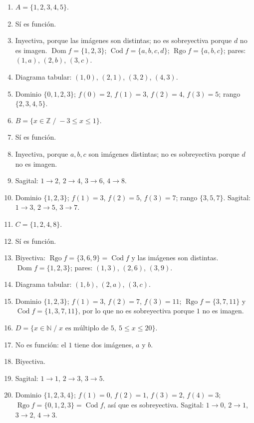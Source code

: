 \documentclass[12pt, letterpaper]{article}
\newcommand{\N}{\mathbb{N}}
\newcommand{\Z}{\mathbb{Z}}
\begin{document}
\begin{enumerate}[leftmargin=*, label=\textbf{\arabic*.}]
  \item $A=\{1,2,3,4,5\}$.
  \item Sí es función.
  \item Inyectiva, porque las imágenes son distintas; no es sobreyectiva porque $d$ no es imagen. $\operatorname{Dom} f=\{1,2,3\}$; $\operatorname{Cod} f=\{a,b,c,d\}$; $\operatorname{Rgo} f=\{a,b,c\}$; pares: $(1,a)$, $(2,b)$, $(3,c)$.
  \item Diagrama tabular: $(1,0)$, $(2,1)$, $(3,2)$, $(4,3)$.
  \item Dominio $\{0,1,2,3\}$; $f(0)=2$, $f(1)=3$, $f(2)=4$, $f(3)=5$; rango $\{2,3,4,5\}$.
  \item $B=\{x\in\Z \;/\; -3\le x\le 1\}$.
  \item Sí es función.
  \item Inyectiva, porque $a,b,c$ son imágenes distintas; no es sobreyectiva porque $d$ no es imagen.
  \item Sagital: $1\to2$, $2\to4$, $3\to6$, $4\to8$.
  \item Dominio $\{1,2,3\}$; $f(1)=3$, $f(2)=5$, $f(3)=7$; rango $\{3,5,7\}$. Sagital: $1\to3$, $2\to5$, $3\to7$.
  \item $C=\{1,2,4,8\}$.
  \item Sí es función.
  \item Biyectiva: $\operatorname{Rgo} f=\{3,6,9\}=\operatorname{Cod} f$ y las imágenes son distintas. $\operatorname{Dom} f=\{1,2,3\}$; pares: $(1,3)$, $(2,6)$, $(3,9)$.
  \item Diagrama tabular: $(1,b)$, $(2,a)$, $(3,c)$.
  \item Dominio $\{1,2,3\}$; $f(1)=3$, $f(2)=7$, $f(3)=11$; $\operatorname{Rgo} f=\{3,7,11\}$ y $\operatorname{Cod} f=\{1,3,7,11\}$, por lo que no es sobreyectiva porque $1$ no es imagen.
  \item $D=\{x\in\N \;/\; x \text{ es múltiplo de } 5,\ 5\le x\le 20\}$.
  \item No es función: el $1$ tiene dos imágenes, $a$ y $b$.
  \item Biyectiva.
  \item Sagital: $1\to1$, $2\to3$, $3\to5$.
  \item Dominio $\{1,2,3,4\}$; $f(1)=0$, $f(2)=1$, $f(3)=2$, $f(4)=3$; $\operatorname{Rgo} f=\{0,1,2,3\}=\operatorname{Cod} f$, así que es sobreyectiva. Sagital: $1\to0$, $2\to1$, $3\to2$, $4\to3$.
\end{enumerate}
\end{document}
